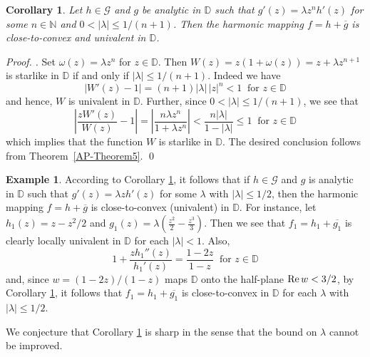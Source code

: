 \documentclass[a4paper,12pt]{amsart}
\newtheorem{cor}{Corollary}
\theoremstyle{definition}
\newtheorem{example}[equation]{Example}
\newenvironment{pf}[1][]{ \vskip 3mm
 \noindent
 \ifthenelse{\equal{#1}{}}  {{\slshape Proof. }}  {{\slshape #1.} } }{\qed\bigskip}
\begin{document}
\begin{cor}\label{AP-Cor1}
Let $h\in\mathcal{G}$ and $g$ be analytic in ${{\mathbb D}}$ such that $g'(z)=\lambda z^nh'(z)$ for some $n\in {{\mathbb N}}$
and $0<|\lambda|\leq 1/{(n+1)}$.
Then the harmonic mapping $f=h+\overline{g}$ is close-to-convex and univalent in ${{\mathbb D}}$.
\end{cor}
\begin{pf}
Set $\omega (z)=\lambda z^n$ for $z\in{{\mathbb D}}$. Then $W(z)=z(1+\omega (z))=z+\lambda z^{n+1}$ is starlike in ${{\mathbb D}}$ if and only if
$|\lambda|\leq 1/{(n+1)}$. Indeed we have
$$|W'(z)-1|=(n+1)|\lambda| \, |z|^n<1 ~\mbox{ for $z\in {{\mathbb D}}$}
$$
and hence, $W$ is univalent in ${{\mathbb D}}$. Further, since $0<|\lambda|\leq 1/(n+1)$, we see that
$$\left |\frac{zW'(z)}{W(z)}-1 \right | =\left |\frac{n\lambda z^n}{1+\lambda z^n}\right |< \frac{n|\lambda|}{1-|\lambda|}\leq 1
~\mbox{ for $z\in {{\mathbb D}}$}
$$
which implies that the function $W$ is starlike in ${{\mathbb D}}$. The desired conclusion follows from Theorem~\ref{AP-Theorem5}.
\end{pf}

\begin{example}
According to Corollary \ref{AP-Cor1}, it follows that if $h\in\mathcal{G}$ and $g$ is analytic in ${{\mathbb D}}$ such that $g'(z)=\lambda zh'(z)$
for some $\lambda$ with $ |\lambda| \leq 1/2$, then the harmonic mapping $f=h+\overline{g}$ is close-to-convex
(univalent) in ${{\mathbb D}}$. For instance, let $h_1(z)=z-z^2/2$ and $g_1(z)=\lambda \left (\frac{z^2}{2}-\frac{z^3}{3}\right )$.
Then we see that $f_1=h_1+\overline{g_1}$ is clearly locally univalent in ${{\mathbb D}}$ for each $|\lambda|< 1$. Also,
$$ 1+\frac{zh_1''(z)}{h_1'(z)}= \frac{1-2z}{1-z} ~\mbox{ for $z\in {{\mathbb D}}$}
$$
and, since $w=(1-2z)/(1-z)$ maps ${{\mathbb D}}$ onto the half-plane ${\rm Re}\, w <3/2$, by Corollary \ref{AP-Cor1}, it follows that
$f_1=h_1+\overline{g_1}$ is close-to-convex in ${{\mathbb D}}$ for each $\lambda$ with $|\lambda | \leq 1/2$.
\end{example}

We conjecture that Corollary \ref{AP-Cor1} is sharp in the sense that the bound on $\lambda$ cannot be improved.
\end{document}
